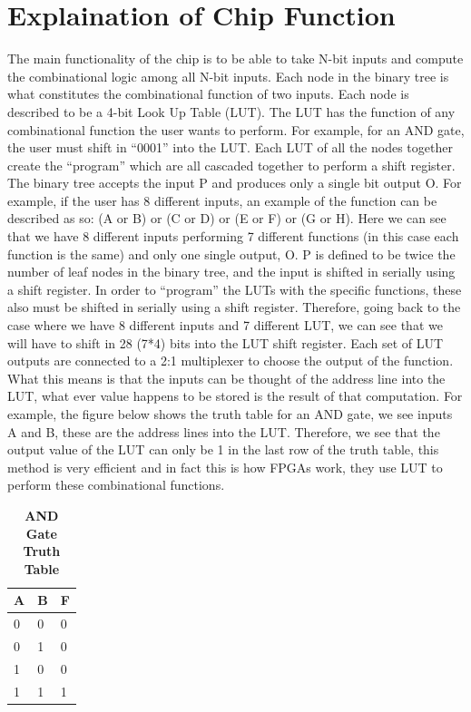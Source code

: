 \documentclass[a4paper]{article}
\begin{document}
    \newpage

\section{\textbf{Explaination of Chip Function}}
    The main functionality of the chip is to be able to take N-bit inputs and compute the combinational logic among
    all N-bit inputs. Each node in the binary tree is what constitutes the combinational function of two inputs. Each
    node is described to be a 4-bit Look Up Table (LUT). The LUT has the function of any combinational function the
    user wants to perform. For example, for an AND gate, the user must shift in ``0001'' into the LUT. Each LUT of
    all the nodes together create the ``program'' which are all cascaded together to perform a shift register. The binary
    tree accepts the input P and produces only a single bit output O. For example, if the user has 8 different inputs, an
    example of the function can be described as so: (A or B) or (C or D) or (E or F) or (G or H). Here we can see that we
    have 8 different inputs performing 7 different functions (in this case each function is the same) and only one single
    output, O. P is defined to be twice the number of leaf nodes in the binary tree, and the input is shifted in serially
    using a shift register. In order to ``program'' the LUTs with the specific functions, these also must be shifted
    in serially using a shift register. Therefore, going back to the case where we have 8 different inputs and 7 different
    LUT, we can see that we will have to shift in 28 (7*4) bits into the LUT shift register. Each set of LUT outputs are connected
    to a 2:1 multiplexer to choose the output of the function. What this means is that the inputs can be thought of the
    address line into the LUT, what ever value happens to be stored is the result of that computation. For example, the figure
    below shows the truth table for an AND gate, we see inputs A and B, these are the address lines into the LUT. Therefore,
    we see that the output value of the LUT can only be 1 in the last row of the truth table, this method is very efficient
    and in fact this is how FPGAs work, they use LUT to perform these combinational functions.

    \begin{table}[H]
        \centering
        \begin{tabular}{ l l | l }
            \hline
            \textbf{A}  & \textbf{B}       & \textbf{F} \\ \hline
                0 & 0 & 0 \\ \hline
                0 & 1 & 0 \\ \hline
                1 & 0 & 0 \\ \hline
                1 & 1 & 1 \\ \hline
        \end{tabular}
        \caption{\textbf{AND Gate Truth Table}}
    \end{table}
\end{document}
